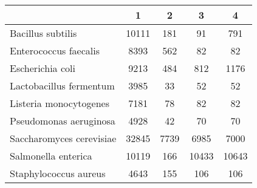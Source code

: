 \begin{adjustbox}{center}
\begin{tabular}{|l||c|c|c|c|}
\hline
& 1 & 2 & 3 & 4 \\
\hline
\hline
Bacillus subtilis & \cellcolor[RGB]{235, 71, 71} 10111 & \cellcolor[RGB]{237, 237, 253} 181 & \cellcolor[RGB]{232, 232, 252} 91 & \cellcolor[RGB]{252, 232, 232} 791 \\
\hline
Enterococcus faecalis & \cellcolor[RGB]{235, 71, 71} 8393 & \cellcolor[RGB]{252, 232, 232} 562 & \cellcolor[RGB]{232, 232, 252} 82 & \cellcolor[RGB]{232, 232, 252} 82 \\
\hline
Escherichia coli & \cellcolor[RGB]{235, 71, 71} 9213 & \cellcolor[RGB]{223, 223, 251} 484 & \cellcolor[RGB]{246, 246, 254} 812 & \cellcolor[RGB]{253, 241, 241} 1176 \\
\hline
Lactobacillus fermentum & \cellcolor[RGB]{235, 71, 71} 3985 & \cellcolor[RGB]{218, 218, 251} 33 & \cellcolor[RGB]{255, 255, 255} 52 & \cellcolor[RGB]{255, 255, 255} 52 \\
\hline
Listeria monocytogenes & \cellcolor[RGB]{235, 71, 71} 7181 & \cellcolor[RGB]{218, 218, 251} 78 & \cellcolor[RGB]{255, 255, 255} 82 & \cellcolor[RGB]{255, 255, 255} 82 \\
\hline
Pseudomonas aeruginosa & \cellcolor[RGB]{235, 71, 71} 4928 & \cellcolor[RGB]{218, 218, 251} 42 & \cellcolor[RGB]{255, 255, 255} 70 & \cellcolor[RGB]{255, 255, 255} 70 \\
\hline
Saccharomyces cerevisiae & \cellcolor[RGB]{235, 71, 71} 32845 & \cellcolor[RGB]{252, 232, 232} 7739 & \cellcolor[RGB]{232, 232, 252} 6985 & \cellcolor[RGB]{232, 232, 252} 7000 \\
\hline
Salmonella enterica & \cellcolor[RGB]{255, 255, 255} 10119 & \cellcolor[RGB]{218, 218, 251} 166 & \cellcolor[RGB]{255, 255, 255} 10433 & \cellcolor[RGB]{255, 255, 255} 10643 \\
\hline
Staphylococcus aureus & \cellcolor[RGB]{235, 71, 71} 4643 & \cellcolor[RGB]{252, 232, 232} 155 & \cellcolor[RGB]{232, 232, 252} 106 & \cellcolor[RGB]{232, 232, 252} 106 \\
\hline
\end{tabular}
\end{adjustbox}
